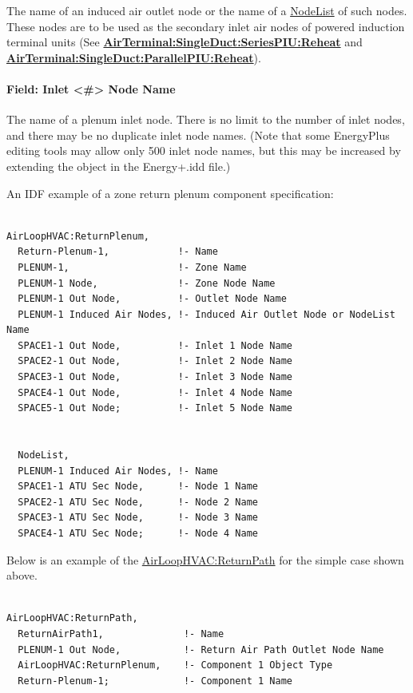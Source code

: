 The name of an induced air outlet node or the name of a \hyperref[nodelist]{NodeList} of such nodes. These nodes are to be used as the secondary inlet air nodes of powered induction terminal units (See \textbf{\hyperref[airterminalsingleductseriespiureheat]{AirTerminal:SingleDuct:SeriesPIU:Reheat}} and \textbf{\hyperref[airterminalsingleductparallelpiureheat]{AirTerminal:SingleDuct:ParallelPIU:Reheat}}).

\paragraph{Field: Inlet \textless{}\#\textgreater{} Node Name}\label{field-inlet-node-name}

The name of a plenum inlet node. There is no limit to the number of inlet nodes, and there may be no duplicate inlet node names. (Note that some EnergyPlus editing tools may allow only 500 inlet node names, but this may be increased by extending the object in the Energy+.idd file.)

An IDF example of a zone return plenum component specification:

\begin{lstlisting}

AirLoopHVAC:ReturnPlenum,
  Return-Plenum-1,            !- Name
  PLENUM-1,                   !- Zone Name
  PLENUM-1 Node,              !- Zone Node Name
  PLENUM-1 Out Node,          !- Outlet Node Name
  PLENUM-1 Induced Air Nodes, !- Induced Air Outlet Node or NodeList Name
  SPACE1-1 Out Node,          !- Inlet 1 Node Name
  SPACE2-1 Out Node,          !- Inlet 2 Node Name
  SPACE3-1 Out Node,          !- Inlet 3 Node Name
  SPACE4-1 Out Node,          !- Inlet 4 Node Name
  SPACE5-1 Out Node;          !- Inlet 5 Node Name


  NodeList,
  PLENUM-1 Induced Air Nodes, !- Name
  SPACE1-1 ATU Sec Node,      !- Node 1 Name
  SPACE2-1 ATU Sec Node,      !- Node 2 Name
  SPACE3-1 ATU Sec Node,      !- Node 3 Name
  SPACE4-1 ATU Sec Node;      !- Node 4 Name
\end{lstlisting}

Below is an example of the \hyperref[airloophvacreturnpath]{AirLoopHVAC:ReturnPath} for the simple case shown above.

\begin{lstlisting}

AirLoopHVAC:ReturnPath,
  ReturnAirPath1,              !- Name
  PLENUM-1 Out Node,           !- Return Air Path Outlet Node Name
  AirLoopHVAC:ReturnPlenum,    !- Component 1 Object Type
  Return-Plenum-1;             !- Component 1 Name
\end{lstlisting}

